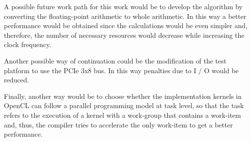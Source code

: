 A possible future work path for this work would be to develop the algorithm by converting the floating-point arithmetic to whole arithmetic. In this way a better performance would be obtained since the calculations would be even simpler and, therefore, the number of necessary resources would decrease while increasing the clock frequency.

Another possible way of continuation could be the modification of the test platform to use the PCIe 3x8 bus. In this way penalties due to I / O would be reduced.

Finally, another way would be to choose whether the implementation kernels in OpenCL can follow a parallel programming model at task level, so that the task refers to the execution of a kernel with a work-group that contains a work-item and, thus, the compiler tries to accelerate the only work-item to get a better performance.